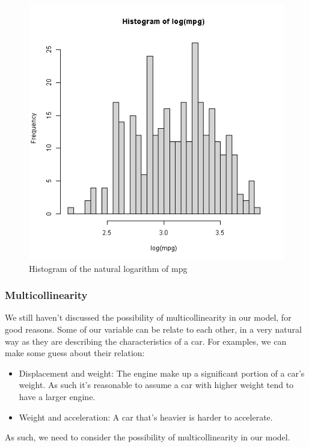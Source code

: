 \begin{figure}[H]
\centering
\includegraphics[scale=0.4]{img/mpgloghist.png}
\caption{Histogram of the natural logarithm of mpg}
\label{fig:my_label_with_H}
\end{figure}

\subsubsection{Multicollinearity}

We still haven't discussed the possibility of multicollinearity in our model, for good reasons. Some of our variable can be relate to each other, in a very natural way as they are describing the characteristics of a car. For examples, we can make some guess about their relation:

\begin{itemize}
    \item Displacement and weight: The engine make up a significant portion of a car's weight. As such it's reasonable to assume a car with higher weight tend to have a larger engine.
    \item Weight and acceleration: A car that's heavier is harder to accelerate.
\end{itemize}

As such, we need to consider the possibility of multicollinearity in our model.

